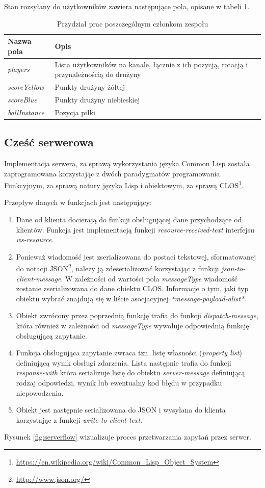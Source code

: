 Stan rozsyłany do użytkowników zawiera następujące pola, opisane w tabeli \ref{tab:state-fields}.

\begin{table}[ht]
  \centering
  \begin{tabular}{ |p{3cm}|p{8cm}| }
    \hline
    \textbf{Nazwa pola} & \textbf{Opis} \\ \hline
    \emph{players} & Lista użytkowników na kanale, łącznie z ich pozycją, rotacją i przynależnością do drużyny \\
    \emph{scoreYellow} & Punkty drużyny żółtej \\
    \emph{scoreBlue} & Punkty drużyny niebieskiej \\
    \emph{ballInstance} & Pozycja piłki \\
    \hline
  \end{tabular}
  \caption{Przydział prac poszczególnym członkom zespołu}
  \label{tab:state-fields}
\end{table}

\subsection{Cześć serwerowa}
Implementacja serwera, za sprawą wykorzystania języka Common Lisp została zaprogramowana korzystając z dwóch paradygmatów programowania. Funkcyjnym, za sprawą natury języka Lisp i obiektowym, za sprawą CLOS\footnote{\url{https://en.wikipedia.org/wiki/Common_Lisp_Object_System}}.

Przepływ danych w funkcjach jest następujący:
\begin{enumerate}
\item Dane od klienta docierają do funkcji obsługującej dane przychodzące od klientów. Funkcja jest implementacją funkcji \emph{resource-received-text} interfejsu \emph{ws-resource}.
\item Ponieważ wiadomość jest zserializowana do postaci tekstowej, sformatowanej do notacji JSON\footnote{\url{http://www.json.org/}}, należy ją zdeserializować korzystając z funkcji \emph{json-to-client-message}. W zależności od wartości pola \emph{messageType} wiadomość zostanie zserializowana do dane obiektu CLOS. Informacje o tym, jaki typ obiektu wybrać znajdują się w liście asocjacyjnej \emph{*message-payload-alist*}.
\item Obiekt zwrócony przez poprzednią funkcję trafia do funkcji \emph{dispatch-message}, która również w zależności od \emph{messageType} wywołuje odpowiednią funkcję obsługującą zapytanie.
\item Funkcja obsługująca zapytanie zwraca tzn. listę własności (\emph{property list}) definiującą wynik obsługi zdarzenia. Lista następnie trafia do funkcji \emph{response-with} która serializuje listę do obiektu \emph{server-message} definiującą rodzaj odpowiedzi, wynik lub ewentualny kod błędu w przypadku niepowodzenia.
\item Obiekt jest następnie serializowana do JSON i wysyłana do klienta korzystając z funkcji \emph{write-to-client-text}.
\end{enumerate}
Rysunek \ref{fig:serverflow} wizualizuje proces przetwarzania zapytań przez serwer.

